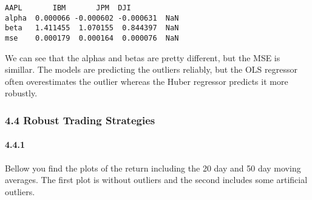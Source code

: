 \documentclass[11pt]{article}
\makeatletter
\newcommand{\boxspacing}{\kern\kvtcb@left@rule\kern\kvtcb@boxsep}
\newcommand{\prompt}[4]{
        {\ttfamily\llap{{\color{#2}[#3]:\hspace{3pt}#4}}\vspace{-\baselineskip}}
    }
\makeatother
\begin{document}
            \begin{tcolorbox}[breakable, size=fbox, boxrule=.5pt, pad at break*=1mm, opacityfill=0]
\prompt{Out}{outcolor}{449}{\boxspacing}
\begin{Verbatim}[commandchars=\\\{\}]
           AAPL       IBM       JPM  DJI
alpha  0.000066 -0.000602 -0.000631  NaN
beta   1.411455  1.070155  0.844397  NaN
mse    0.000179  0.000164  0.000076  NaN
\end{Verbatim}
\end{tcolorbox}
        
    We can see that the alphas and betas are pretty different, but the MSE
is simillar. The models are predicting the outliers reliably, but the
OLS regressor often overestimates the outlier whereas the Huber
regressor predicts it more robustly.

    \hypertarget{robust-trading-strategies}{%
\subsubsection{4.4 Robust Trading
Strategies}\label{robust-trading-strategies}}

    \hypertarget{section}{%
\paragraph{4.4.1}\label{section}}

    Bellow you find the plots of the return including the 20 day and 50 day
moving averages. The first plot is without outliers and the second
includes some artificial outliers.
\end{document}

